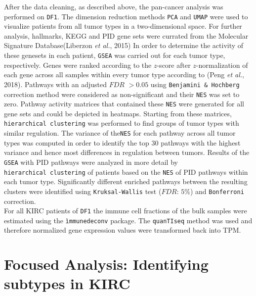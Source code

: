 \documentclass[
  parskip,
  oneside]{scrreprt}
\begin{document}
After the data cleaning, as described above, the pan-cancer analysis was
performed on \texttt{DF1}. The dimension reduction methods \texttt{PCA}
and \texttt{UMAP} were used to visualize patients from all tumor types
in a two-dimensional space. For further analysis, hallmarks, KEGG and
PID gene sets were currated from the Molecular Signature
Database(Liberzon \emph{et al.}, 2015) In order to determine the
activity of these genesets in each patient, \texttt{GSEA} was carried
out for each tumor type, respectively. Genes were ranked according to
the \(z\)-score after \(z\)-normalization of each gene across all
samples within every tumor type according to (Peng \emph{et al.}, 2018).
Pathways with an adjusted \(FDR\) \(>0.05\) using
\texttt{Benjamini\ \&\ Hochberg} correction method were considered as
non-significant and their \texttt{NES} was set to zero. Pathway activity
matrices that contained these \texttt{NES} were generated for all gene
sets and could be depicted in heatmaps. Starting from these matrices,
\texttt{hierarchical\ clustering} was performed to find groups of tumor
types with similar regulation. The variance of the\texttt{NES} for each
pathway across all tumor types was computed in order to identify the top
30 pathways with the highest variance and hence most differences in
regulation between tumors. Results of the \texttt{GSEA} with PID
pathways were analyzed in more detail by
\texttt{hierarchical\ clustering} of patients based on the \texttt{NES}
of PID pathways within each tumor type. Significantly different enriched
pathways between the resulting clusters were identified using
\texttt{Kruksal-Wallis} test (\(FDR\): \(5\%\)) and \texttt{Bonferroni}
correction.\\
For all KIRC patients of \texttt{DF1} the immune cell fractions of the
bulk samples were estimated using the \texttt{ìmmunedeconv} package. The
\texttt{quanTIseq} method was used and therefore normalized gene
expression values were transformed back into TPM.

\hypertarget{focused-analysis-identifying-subtypes-in-kirc}{%
\section{Focused Analysis: Identifying subtypes in
KIRC}\label{focused-analysis-identifying-subtypes-in-kirc}}
\end{document}
